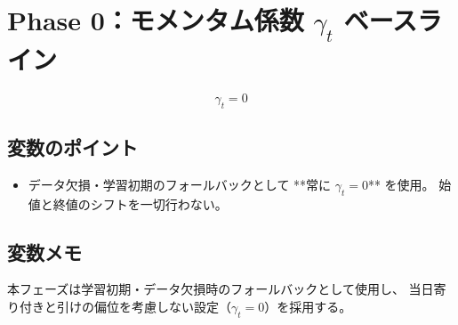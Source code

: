 
\section*{Phase 0：モメンタム係数 $\gamma_t$ ベースライン}\nopagebreak[4]
\begin{flushleft}
\[
  \boxed{\gamma_t = 0}
\]
\end{flushleft}

\subsection*{変数のポイント}
\begin{flushleft}
\begin{itemize}
  \item データ欠損・学習初期のフォールバックとして **常に \(\gamma_t=0\)** を使用。  
        始値と終値のシフトを一切行わない。
\end{itemize}
\end{flushleft}

\subsection*{変数メモ}
\begin{flushleft}
本フェーズは学習初期・データ欠損時のフォールバックとして使用し、  
当日寄り付きと引けの偏位を考慮しない設定（$\gamma_t=0$）を採用する。
\end{flushleft}
